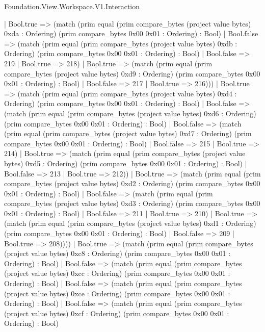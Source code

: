 \begin{lexlean}{Foundation.View.Workspace.V1.Interaction}
\begin{semanticmodule}
{                | Bool.true => (match (prim equal (prim compare_bytes (project value bytes) 0xda : Ordering) (prim compare_bytes 0x00 0x01 : Ordering) : Bool)
                  | Bool.false => (match (prim equal (prim compare_bytes (project value bytes) 0xdb : Ordering) (prim compare_bytes 0x00 0x01 : Ordering) : Bool)
                    | Bool.false => 219
                    | Bool.true => 218)
                  | Bool.true => (match (prim equal (prim compare_bytes (project value bytes) 0xd9 : Ordering) (prim compare_bytes 0x00 0x01 : Ordering) : Bool)
                    | Bool.false => 217
                    | Bool.true => 216)))
              | Bool.true => (match (prim equal (prim compare_bytes (project value bytes) 0xd4 : Ordering) (prim compare_bytes 0x00 0x01 : Ordering) : Bool)
                | Bool.false => (match (prim equal (prim compare_bytes (project value bytes) 0xd6 : Ordering) (prim compare_bytes 0x00 0x01 : Ordering) : Bool)
                  | Bool.false => (match (prim equal (prim compare_bytes (project value bytes) 0xd7 : Ordering) (prim compare_bytes 0x00 0x01 : Ordering) : Bool)
                    | Bool.false => 215
                    | Bool.true => 214)
                  | Bool.true => (match (prim equal (prim compare_bytes (project value bytes) 0xd5 : Ordering) (prim compare_bytes 0x00 0x01 : Ordering) : Bool)
                    | Bool.false => 213
                    | Bool.true => 212))
                | Bool.true => (match (prim equal (prim compare_bytes (project value bytes) 0xd2 : Ordering) (prim compare_bytes 0x00 0x01 : Ordering) : Bool)
                  | Bool.false => (match (prim equal (prim compare_bytes (project value bytes) 0xd3 : Ordering) (prim compare_bytes 0x00 0x01 : Ordering) : Bool)
                    | Bool.false => 211
                    | Bool.true => 210)
                  | Bool.true => (match (prim equal (prim compare_bytes (project value bytes) 0xd1 : Ordering) (prim compare_bytes 0x00 0x01 : Ordering) : Bool)
                    | Bool.false => 209
                    | Bool.true => 208))))
            | Bool.true => (match (prim equal (prim compare_bytes (project value bytes) 0xc8 : Ordering) (prim compare_bytes 0x00 0x01 : Ordering) : Bool)
              | Bool.false => (match (prim equal (prim compare_bytes (project value bytes) 0xcc : Ordering) (prim compare_bytes 0x00 0x01 : Ordering) : Bool)
                | Bool.false => (match (prim equal (prim compare_bytes (project value bytes) 0xce : Ordering) (prim compare_bytes 0x00 0x01 : Ordering) : Bool)
                  | Bool.false => (match (prim equal (prim compare_bytes (project value bytes) 0xcf : Ordering) (prim compare_bytes 0x00 0x01 : Ordering) : Bool)
}
\end{semanticmodule}
\end{lexlean}
